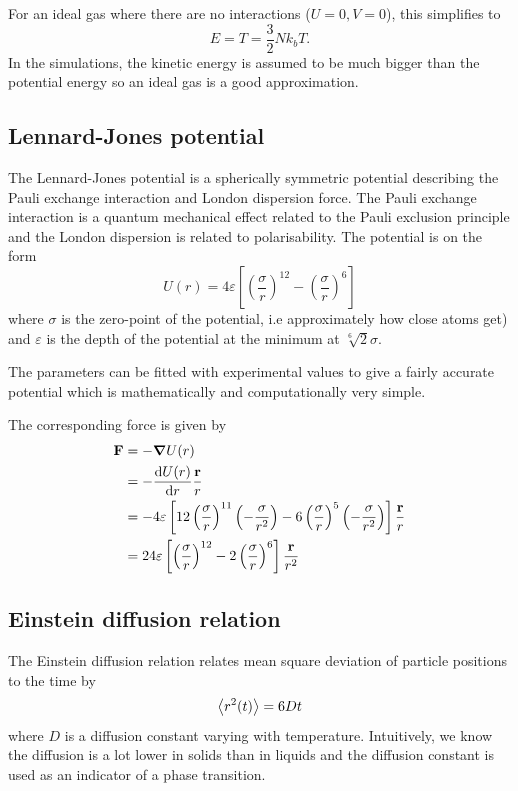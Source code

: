 \documentclass[fleqn]{scrartcl}
\renewcommand{\epsilon}{\varepsilon}
\begin{document}
	For an ideal gas where there are no interactions ($U=0,V=0$), this simplifies to	
	\begin{equation}
		E = T = \frac32Nk_b T.
	\end{equation}
	In the simulations, the kinetic energy is assumed to be much bigger than the potential energy so an ideal gas is a good approximation.
	
	
	\subsection{Lennard-Jones potential}
	The Lennard-Jones potential is a spherically symmetric potential describing the Pauli exchange interaction and London dispersion force. The Pauli exchange interaction is a quantum mechanical effect related to the Pauli exclusion principle and the London dispersion is related to polarisability. The potential is on the form
	\begin{equation}
		U(r) = 4\epsilon\left[\left(\frac{\sigma}{r}\right)^{12}-\left(\frac{\sigma}{r}\right)^6\right]
	\end{equation}
	where $\sigma$ is the zero-point of the potential, i.e approximately how close atoms get) and $\epsilon$ is the depth of the potential at the minimum at $\sqrt[6]{2}\sigma$.

	The parameters can be fitted with experimental values to give a fairly accurate potential which is mathematically and computationally very simple.
	
	The corresponding force is given by
	\begin{align}
		\vb{F} &= -\grad{U(r)} \\
		&= -\dv{U(r)}{r}\frac{\vb{r}}{r} \\
		&= -4\epsilon\left[12\left(\frac{\sigma}{r}\right)^{11}\left(-\frac{\sigma}{r^2}\right)-6\left(\frac{\sigma}{r}\right)^5\left(-\frac{\sigma}{r^2}\right)\right]\frac{\vb{r}}{r} \\
		&= 24\epsilon\left[\left(\frac{\sigma}{r}\right)^{12}-2\left(\frac{\sigma}{r}\right)^6\right]\frac{\vb{r}}{r^2} 
	\end{align}

	\subsection{Einstein diffusion relation}
	The Einstein diffusion relation relates mean square deviation of particle positions to the time by
	\begin{equation}
		\expval{r^2(t)}=6Dt
	\end{equation}
	where $D$ is a diffusion constant varying with temperature. Intuitively, we know the diffusion is a lot lower in solids than in liquids and the diffusion constant is used as an indicator of a phase transition.
\end{document}
